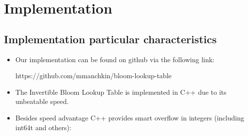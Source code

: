 \documentclass{article}
\begin{document}
\section{Implementation}
\subsection{Implementation particular characteristics}
\begin{itemize}
    \item Our implementation can be found on github via the following link:

        https://github.com/mmanchkin/bloom-lookup-table

    \item The Invertible Bloom Lookup Table is implemented in C++ due to its unbeatable
speed. 
    \item Besides speed advantage C++ provides smart overflow in integers 
        (including int64t and others): 
        

\end{itemize}
\end{document}
